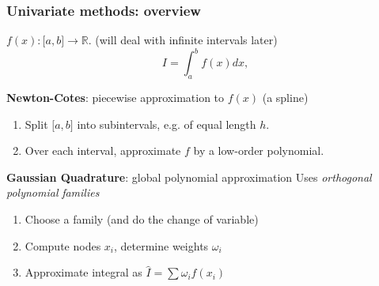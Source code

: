 \documentclass[bigger,handout]{beamer}
\begin{document}
\begin{frame}%
\frametitle{Univariate methods: overview}

$f(x):\mathbb{[}a,b\mathbb{]}\rightarrow \mathbb{R}$. (will deal with
infinite intervals later)%
\begin{equation*}
I=\int_{a}^{b}f(x)dx,
\end{equation*}

\textbf{Newton-Cotes}: piecewise approximation to $f(x)$ (a spline)

\begin{enumerate}
\item Split $\mathbb{[}a,b\mathbb{]}$ into subintervals, e.g. of equal
length $h$.

\item Over each interval, approximate $f$ by a low-order polynomial.
\end{enumerate}

\textbf{Gaussian Quadrature}: global polynomial approximation\newline
Uses \emph{orthogonal polynomial} \emph{families}

\begin{enumerate}
\item Choose a family (and do the change of variable)

\item Compute nodes $x_{i}$, determine weights $\omega _{i}$

\item Approximate integral as $\hat{I}=\sum \omega _{i}f(x_{i})$
\end{enumerate}




\end{frame}%
\end{document}
